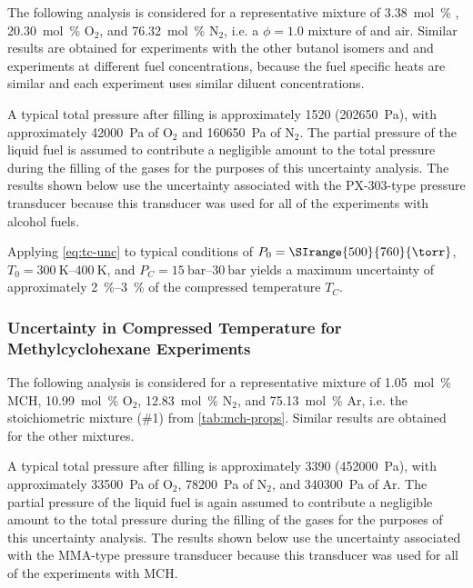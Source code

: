 \documentclass[../main.tex]{subfiles}
\begin{document}
The following analysis is considered for a representative mixture of
\SI{3.38}{\mole\percent} \tBuOH{}, \SI{20.30}{\mole\percent} O$_2$, and
\SI{76.32}{\mole\percent} N$_2$, i.e. a $\phi=1.0$ mixture of \tBuOH{}
and air. Similar results are obtained for experiments with the other butanol
isomers and \iPeOH{} and experiments at different fuel concentrations,
because the fuel specific heats are similar and each experiment uses
similar diluent concentrations.

A typical total pressure after filling is approximately
\SI{1520}{\torr} (\SI{202650}{\pascal}), with approximately
\SI{42000}{\pascal} of O$_2$ and \SI{160650}{\pascal} of N$_2$. The partial
pressure of the liquid fuel is assumed to contribute a negligible amount
to the total pressure during the filling of the gases for the purposes of
this uncertainty analysis. The results shown below use the
uncertainty associated with the PX-303-type pressure transducer because
this transducer was used for all of the experiments with alcohol fuels.

Applying \cref{eq:tc-unc} to typical conditions of $P_0 = \SIrange{500}{760}{\torr}$,
$T_0=\SIrange{300}{400}{\kelvin}$, and $P_C=\SIrange{15}{30}{\bar}$ yields
a maximum uncertainty of approximately \SIrange{2}{3}{\percent} of the
compressed temperature $T_C$.

\subsubsection{Uncertainty in Compressed Temperature for Methylcyclohexane Experiments}
\label{sec:unc-mch}

The following analysis is considered for a representative mixture of
\SI{1.05}{\mole\percent} MCH, \SI{10.99}{\mole\percent} O$_2$,
\SI{12.83}{\mole\percent} N$_2$, and \SI{75.13}{\mole\percent} Ar, i.e.
the stoichiometric mixture (\#1) from \cref{tab:mch-props}. Similar
results are obtained for the other mixtures.

A typical total pressure after filling is approximately
\SI{3390}{\torr} (\SI{452000}{\pascal}), with approximately
\SI{33500}{\pascal} of O$_2$, \SI{78200}{\pascal} of N$_2$, and
\SI{340300}{\pascal} of Ar. The partial pressure of the liquid fuel is
again assumed to contribute a negligible amount to the total pressure
during the filling of the gases for the purposes of this uncertainty
analysis. The results shown below use the uncertainty associated with
the MMA-type pressure transducer because this transducer was used for
all of the experiments with MCH.
\end{document}
